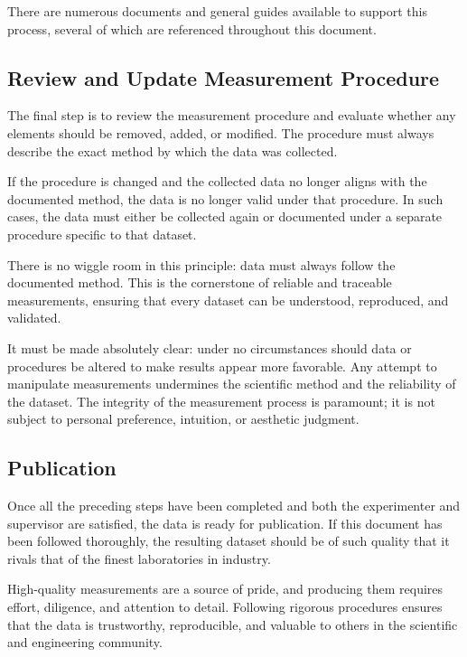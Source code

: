 There are numerous documents and general guides available to support this process, several of which are referenced throughout this document.


\subsection{Review and Update Measurement Procedure}
The final step is to review the measurement procedure and evaluate whether any elements should be removed, added, or modified. The procedure must always describe the exact method by which the data was collected.

If the procedure is changed and the collected data no longer aligns with the documented method, the data is no longer valid under that procedure. In such cases, the data must either be collected again or documented under a separate procedure specific to that dataset.

There is no wiggle room in this principle: data must always follow the documented method. This is the cornerstone of reliable and traceable measurements, ensuring that every dataset can be understood, reproduced, and validated.

It must be made absolutely clear: under no circumstances should data or procedures be altered to make results appear more favorable. Any attempt to manipulate measurements undermines the scientific method and the reliability of the dataset. The integrity of the measurement process is paramount; it is not subject to personal preference, intuition, or aesthetic judgment. 

\subsection{Publication}
Once all the preceding steps have been completed and both the experimenter and supervisor are satisfied, the data is ready for publication. If this document has been followed thoroughly, the resulting dataset should be of such quality that it rivals that of the finest laboratories in industry. 

High-quality measurements are a source of pride, and producing them requires effort, diligence, and attention to detail. Following rigorous procedures ensures that the data is trustworthy, reproducible, and valuable to others in the scientific and engineering community.